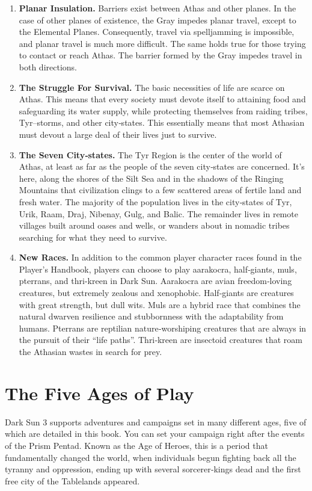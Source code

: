 \documentclass[10pt,a4paper,twocolumn]{d20}
\begin{document}
\begin{enumerate}
\item \textbf{Planar Insulation.} Barriers exist between Athas and other planes. In the case of other planes of existence, the Gray impedes planar travel, except to the Elemental Planes. Consequently, travel via spelljamming is impossible, and planar travel is much more difficult. The same holds true for those trying to contact or reach Athas. The barrier formed by the Gray impedes travel in both directions.
\item \textbf{The Struggle For Survival.} The basic necessities of life are scarce on Athas. This means that every society must devote itself to attaining food and safeguarding its water supply, while protecting themselves from raiding tribes, Tyr–storms, and other city‐states. This essentially means that most Athasian must devout a large deal of their lives just to survive.
\item \textbf{The Seven City‐states.} The Tyr Region is the center of the world of Athas, at least as far as the people of the seven city‐states are concerned. It’s here, along the shores of the Silt Sea and in the shadows of the Ringing Mountains that civilization clings to a few scattered areas of fertile land and fresh water. The majority of the population lives in the city‐states of Tyr, Urik, Raam, Draj, Nibenay, Gulg, and Balic. The remainder lives in remote villages built around oases and wells, or wanders about in nomadic tribes searching for what they need to survive.
\item \textbf{New Races.} In addition to the common player character races found in the Player’s Handbook, players can choose to play aarakocra, half‐giants, muls, pterrans, and thri-kreen in Dark Sun. Aarakocra are avian freedom‐loving creatures, but extremely zealous and xenophobic. Half‐giants are creatures with great strength, but dull wits. Muls are a hybrid race that combines the natural dwarven resilience and stubbornness with the adaptability from humans. Pterrans are reptilian nature‐worshiping creatures that are always in the pursuit of their ``life paths''. Thri‐kreen are insectoid creatures that roam the Athasian wastes in search for prey.
\end{enumerate}

\section{The Five Ages of Play}

Dark Sun 3 supports adventures and campaigns set in many different ages, five of which are detailed in this book. You can set your campaign right after the events of the Prism Pentad. Known as the Age of Heroes, this is a period that fundamentally changed the world, when individuals begun fighting back all the tyranny and oppression, ending up with several sorcerer‐kings dead and the first free city of the Tablelands appeared.
\end{document}

